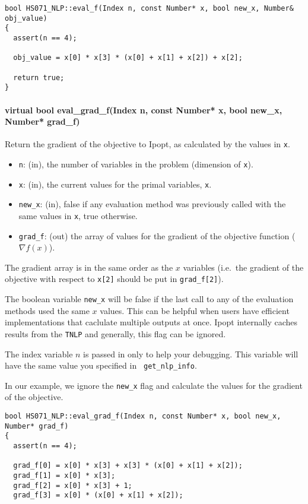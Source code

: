 \documentclass[letter,10pt]{article}
\begin{document}
{\begin{verbatim}
bool HS071_NLP::eval_f(Index n, const Number* x, bool new_x, Number& obj_value)
{
  assert(n == 4);

  obj_value = x[0] * x[3] * (x[0] + x[1] + x[2]) + x[2];

  return true;
}
\end{verbatim}

\paragraph{virtual bool eval\_grad\_f(Index n, const Number* x, bool new\_x, 
        Number* grad\_f)} 
$\;$ \\
Return the gradient of the objective to Ipopt, as calculated by the values in {\tt x}.
\begin{itemize}
\item {\tt n}: (in), the number of variables in the problem (dimension of {\tt x}). 
\item {\tt x}: (in), the current values for the primal variables, {\tt x}.
\item {\tt new\_x}: (in), false if any evaluation method was previously called 
        with the same values in {\tt x}, true otherwise.
\item {\tt grad\_f}: (out) the array of values for the gradient of the 
        objective function ($\nabla f(x)$).
\end{itemize}

The gradient array is in the same order as the $x$ variables (i.e.\ the
gradient of the objective with respect to {\tt x[2]} should be put in
{\tt grad\_f[2]}).

The boolean variable {\tt new\_x} will be false if the last call to
any of the evaluation methods used the same $x$ values. This can be
helpful when users have efficient implementations that caclulate
multiple outputs at once. Ipopt internally caches results from the
{\tt TNLP} and generally, this flag can be ignored.

The index variable $n$ is passed in only to help your debugging. This
variable will have the same value you specified in {\tt
get\_nlp\_info}.

In our example, we ignore the {\tt new\_x} flag and calculate the
values for the gradient of the objective.
\begin{verbatim}
bool HS071_NLP::eval_grad_f(Index n, const Number* x, bool new_x, Number* grad_f)
{
  assert(n == 4);

  grad_f[0] = x[0] * x[3] + x[3] * (x[0] + x[1] + x[2]);
  grad_f[1] = x[0] * x[3];
  grad_f[2] = x[0] * x[3] + 1;
  grad_f[3] = x[0] * (x[0] + x[1] + x[2]);


\end{verbatim}}
\end{document}
